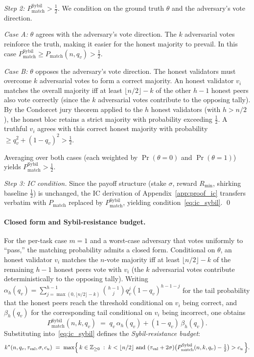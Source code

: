 \textit{Step 2: $P_{\text{match}}^{\text{Sybil}} > \frac{1}{2}$.} We condition on the ground truth $\theta$ and the adversary's vote direction.

\textit{Case A:} $\theta$ agrees with the adversary's vote direction. The $k$ adversarial votes reinforce the truth, making it easier for the honest majority to prevail. In this case $P_{\text{match}}^{\text{Sybil}} \geq P_{\text{match}}(n, q_v) > \frac{1}{2}$.

\textit{Case B:} $\theta$ opposes the adversary's vote direction. The honest validators must overcome $k$ adversarial votes to form a correct majority. An honest validator $v_i$ matches the overall majority iff at least $\lfloor n/2 \rfloor - k$ of the other $h - 1$ honest peers also vote correctly (since the $k$ adversarial votes contribute to the opposing tally). By the Condorcet jury theorem applied to the $h$ honest validators (with $h > n/2$), the honest bloc retains a strict majority with probability exceeding $\frac{1}{2}$. A truthful $v_i$ agrees with this correct honest majority with probability $\geq q_v^2 + (1-q_v)^2 > \frac{1}{2}$.

Averaging over both cases (each weighted by $\Pr(\theta = 0)$ and $\Pr(\theta = 1)$) yields $P_{\text{match}}^{\text{Sybil}} > \frac{1}{2}$.

\textit{Step 3: IC condition.} Since the payoff structure (stake $\sigma$, reward $R_{\min}$, shirking baseline $\frac{1}{2}$) is unchanged, the IC derivation of Appendix~\ref{app:proof_ic} transfers verbatim with $P_{\text{match}}$ replaced by $P_{\text{match}}^{\text{Sybil}}$, yielding condition~\eqref{eq:ic_sybil}. \qed

\paragraph{Closed form and Sybil-resistance budget.}
For the per-task case $m = 1$ and a worst-case adversary that votes uniformly to ``pass,'' the matching probability admits a closed form. Conditional on $\theta$, an honest validator $v_i$ matches the $n$-vote majority iff at least $\lfloor n/2 \rfloor - k$ of the remaining $h - 1$ honest peers vote with $v_i$ (the $k$ adversarial votes contribute deterministically to the opposing tally). Writing $\alpha_h(q_v) = \sum_{j = \max(0, \lfloor n/2 \rfloor - k)}^{h-1} \binom{h-1}{j} q_v^j (1-q_v)^{h-1-j}$ for the tail probability that the honest peers reach the threshold conditional on $v_i$ being correct, and $\beta_h(q_v)$ for the corresponding tail conditional on $v_i$ being incorrect, one obtains
\[
P_{\text{match}}^{\text{Sybil}}(n, k, q_v) \;=\; q_v\,\alpha_h(q_v) + (1 - q_v)\,\beta_h(q_v).
\]
Substituting into~\eqref{eq:ic_sybil} defines the \emph{Sybil-resistance budget}:
\[
k^*(n, q_v, \tau_{\text{val}}, \sigma, c_u) \;=\; \max\Bigl\{\,k \in \mathbb{Z}_{\geq 0} \;:\; k < \lfloor n/2 \rfloor \text{ and } (\tau_{\text{val}} + 2\sigma)\bigl(P_{\text{match}}^{\text{Sybil}}(n, k, q_v) - \tfrac{1}{2}\bigr) > c_u \,\Bigr\}.
\]

